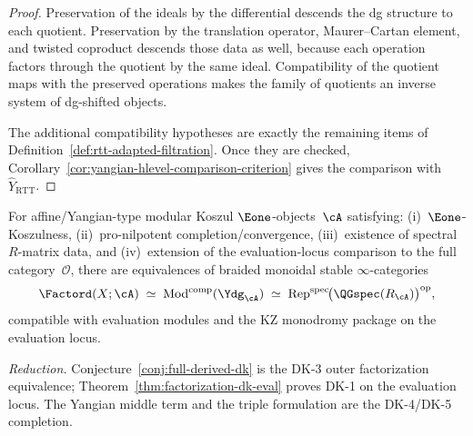 \begin{proof}
Preservation of the ideals by the differential descends the dg
structure to each quotient. Preservation by the translation operator,
Maurer--Cartan element, and twisted coproduct descends those data as
well, because each operation factors through the quotient by the same
ideal. Compatibility of the quotient maps with the preserved
operations makes the family of quotients an inverse system of
dg-shifted objects.

The additional compatibility hypotheses are exactly the remaining items
of Definition~\ref{def:rtt-adapted-filtration}. Once they are checked,
Corollary~\ref{cor:yangian-hlevel-comparison-criterion} gives the
comparison with $\widehat Y_{\mathrm{RTT}}$.
\end{proof}

\begin{conjecture}
\label{conj:full-dk-bridge}
For affine/Yangian-type modular Koszul $\Eone$-objects~$\cA$
satisfying:
\textup{(i)}~$\Eone$-Koszulness,
\textup{(ii)}~pro-nilpotent completion/convergence,
\textup{(iii)}~existence of spectral $R$-matrix data, and
\textup{(iv)}~extension of the evaluation-locus comparison to
the full category~$\mathcal{O}$,
there are equivalences of braided monoidal stable
$\infty$-categories
\begin{equation}\label{eq:triple-equivalence}
\Factord(X;\cA)
\;\simeq\;
\operatorname{Mod}^{\mathrm{comp}}(\Ydg_{\cA})
\;\simeq\;
\operatorname{Rep}^{\mathrm{spec}}\!
 \bigl(\QGspec(R_{\cA})\bigr)^{\mathrm{op}},
\end{equation}
compatible with evaluation modules and the KZ monodromy package on the
evaluation locus.

\smallskip\noindent
\emph{Reduction.}
Conjecture~\textup{\ref{conj:full-derived-dk}} is the DK-3 outer
factorization equivalence; Theorem~\textup{\ref{thm:factorization-dk-eval}}
proves DK-1 on the evaluation locus. The Yangian middle term and the
triple formulation are the DK-4/DK-5 completion.
\end{conjecture}

